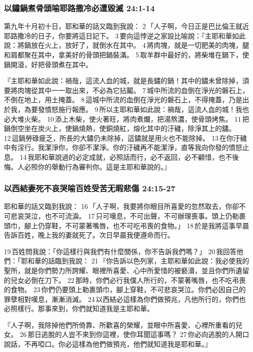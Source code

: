 \subsubsection{以鏽鍋煮骨頭喻耶路撒冷必遭毀滅 24:1-14}
第九年十月初十日，耶和華的話又臨到我說： 2 「人子啊，今日正是巴比倫王就近耶路撒冷的日子，你要將這日記下。 3 要向這悖逆之家設比喻說：『主耶和華如此說：將鍋放在火上，放好了，就倒水在其中。 4 將肉塊，就是一切肥美的肉塊，腿和肩都聚在其中，拿美好的骨頭把鍋裝滿。 5 取羊群中最好的，將柴堆在鍋下，使鍋開滾，好把骨頭煮在其中。

『主耶和華如此說：禍哉，這流人血的城，就是長鏽的鍋！其中的鏽未曾除掉，須要將肉塊從其中一一取出來，不必為它拈鬮。 7 城中所流的血倒在淨光的磐石上，不倒在地上，用土掩蓋。 8 這城中所流的血倒在淨光的磐石上，不得掩蓋，乃是出於我，為要發憤怒施行報應。 9 所以主耶和華如此說：禍哉，這流人血的城！我也必大堆火柴。 10 添上木柴，使火著旺，將肉煮爛，把湯熬濃，使骨頭烤焦。 11 把鍋倒空坐在炭火上，使鍋燒熱，使銅燒紅，熔化其中的汙穢，除淨其上的鏽。 12 這鍋勞碌疲乏，所長的大鏽仍未除掉，這鏽就是用火也不能除掉。 13 在你汙穢中有淫行。我潔淨你，你卻不潔淨。你的汙穢再不能潔淨，直等我向你發的憤怒止息。 14 我耶和華說過的必定成就，必照話而行，必不返回，必不顧惜，也不後悔。人必照你的舉動行為審判你。這是主耶和華說的。』

\subsubsection{以西結妻死不哀哭喻百姓受苦无暇悲傷 24:15-27}
耶和華的話又臨到我說： 16 「人子啊，我要將你眼目所喜愛的忽然取去，你卻不可悲哀哭泣，也不可流淚。 17 只可嘆息，不可出聲，不可辦理喪事。頭上仍勒裹頭巾，腳上仍穿鞋，不可蒙著嘴唇，也不可吃弔喪的食物。」 18 於是我將這事早晨告訴百姓，晚上我的妻就死了。次日早晨我便遵命而行。

19 百姓問我說：「你這樣行與我們有什麼關係，你不告訴我們嗎？」 20 我回答他們：「耶和華的話臨到我說： 21 『你告訴以色列家，主耶和華如此說：我必使我的聖所，就是你們勢力所誇耀、眼裡所喜愛、心中所愛惜的被褻瀆，並且你們所遺留的兒女必倒在刀下。 22 那時，你們必行我僕人所行的，不蒙著嘴唇，也不吃弔喪的食物。 23 你們仍要頭上勒裹頭巾，腳上穿鞋，不可悲哀哭泣。你們必因自己的罪孽相對嘆息，漸漸消滅。 24 以西結必這樣為你們做預兆，凡他所行的，你們也必照樣行。那事來到，你們就知道我是主耶和華。

『人子啊，我除掉他們所倚靠、所歡喜的榮耀，並眼中所喜愛、心裡所重看的兒女。 26 那日逃脫的人豈不來到你這裡，使你耳聞這事嗎？ 27 你必向逃脫的人開口說話，不再啞口。你必這樣為他們做預兆，他們就知道我是耶和華。』


